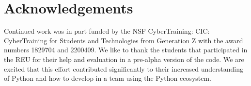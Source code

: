 

\section*{Acknowledgements}
Continued work was in part funded by the NSF CyberTraining: CIC:
CyberTraining for Students and Technologies from Generation Z with the
award numbers 1829704 and 2200409. We like to thank the students that
participated in the REU for their help and evaluation in a pre-alpha
version of the code. We are excited that this effort contributed
significantly to their increased understanding of Python and how to
develop in a team using the Python ecosystem.


